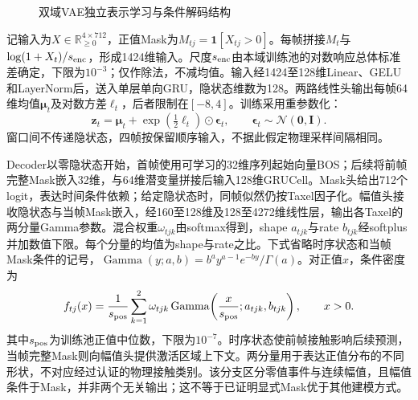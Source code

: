 \begin{figure}[htbp]
 \centering
 \caption{双域VAE独立表示学习与条件解码结构}
 \label{fig:ch05_dual_vae}
\end{figure}

记输入为$X\in\mathbb R_{\ge0}^{4\times712}$，正值Mask为$M_{tj}=\mathbf1[X_{tj}>0]$。每帧拼接$M_t$与$\log(1+X_t)/s_{\rm enc}$，形成1424维输入。尺度$s_{\rm enc}$由本域训练池的对数响应总体标准差确定，下限为$10^{-3}$；仅作除法，不减均值。输入经1424至128维Linear、GELU和LayerNorm后，送入单层单向GRU，隐状态维数为128。两路线性头输出每帧64维均值$\boldsymbol\mu_t$及对数方差$\boldsymbol\ell_t$，后者限制在$[-8,4]$。训练采用重参数化：
\begin{equation}
 \boldsymbol z_t=\boldsymbol\mu_t+
 \exp\!\left(\tfrac12\boldsymbol\ell_t\right)\odot\boldsymbol\epsilon_t,
 \qquad \boldsymbol\epsilon_t\sim\mathcal N(\boldsymbol0,\boldsymbol I).
 \label{eq:ch05_vae_reparameterization}
\end{equation}
窗口间不传递隐状态，四帧按保留顺序输入，不据此假定物理采样间隔相同。

Decoder以零隐状态开始，首帧使用可学习的32维序列起始向量BOS；后续将前帧完整Mask嵌入32维，与64维潜变量拼接后输入128维GRUCell。Mask头给出712个logit，表达时间条件依赖；给定隐状态时，同帧似然仍按Taxel因子化。幅值头接收隐状态与当帧Mask嵌入，经160至128维及128至4272维线性层，输出各Taxel的两分量Gamma参数。混合权重$\omega_{tjk}$由softmax得到，shape $a_{tjk}$与rate $b_{tjk}$经softplus并加数值下限。每个分量的均值为shape与rate之比。下式省略时序状态和当帧Mask条件的记号，$\operatorname{Gamma}(y;a,b)=b^a y^{a-1}e^{-by}/\Gamma(a)$。对正值$x$，条件密度为
\begin{equation}
 f_{tj}(x)=\frac1{s_{\rm pos}}\sum_{k=1}^{2}\omega_{tjk}
 \operatorname{Gamma}\!\left(\frac{x}{s_{\rm pos}};a_{tjk},b_{tjk}\right),
 \qquad x>0.
 \label{eq:ch05_vae_gamma_mixture}
\end{equation}
其中$s_{\rm pos}$为训练池正值中位数，下限为$10^{-7}$。时序状态使前帧接触影响后续预测，当帧完整Mask则向幅值头提供激活区域上下文。两分量用于表达正值分布的不同形状，不对应经过认证的物理接触类别。该分支区分零值事件与连续幅值，且幅值条件于Mask，并非两个无关输出；这不等于已证明显式Mask优于其他建模方式。

